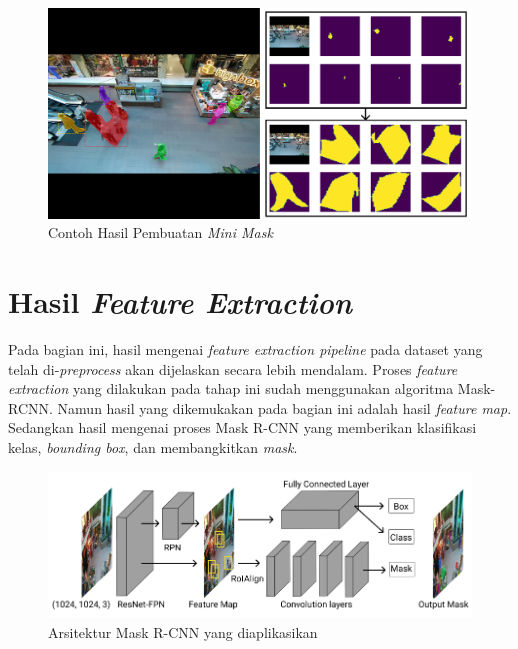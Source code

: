 \begin{figure}[h!]
  \begin{center}
    \includegraphics[width= 0.8\linewidth]{bab4/Mini Mask.png}
    \caption{Contoh Hasil Pembuatan \textit{Mini Mask}}
    \label{fig: Contoh Mini Mask}
  \end{center}
\end{figure}

\section{Hasil \textit{Feature Extraction}}
Pada bagian ini, hasil mengenai \textit{feature extraction pipeline} pada dataset yang telah di-\textit{preprocess}
akan dijelaskan secara lebih mendalam. Proses \textit{feature extraction} yang dilakukan pada tahap ini sudah
menggunakan algoritma Mask-RCNN. Namun hasil yang dikemukakan pada bagian ini adalah hasil \textit{feature map}.
Sedangkan hasil mengenai proses Mask R-CNN yang memberikan klasifikasi kelas, \textit{bounding box}, dan membangkitkan
\textit{mask}.

\begin{figure}[h!]
    \begin{center}
      \includegraphics[width= 0.8\linewidth]{bab4/Metodologi_Training_2.png}
      \caption{Arsitektur Mask R-CNN yang diaplikasikan}
      \label{fig: Crowd Mask RCNN Archi}
    \end{center}
\end{figure}

